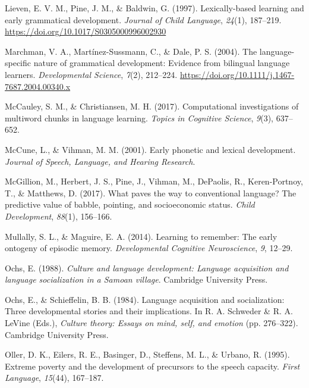 \documentclass[
  english,
  ,man,floatsintext]{apa6}
\begin{document}
\leavevmode\hypertarget{ref-lieven1997lexically}{}%
Lieven, E. V. M., Pine, J. M., \& Baldwin, G. (1997). Lexically-based learning and early grammatical development. \emph{Journal of Child Language}, \emph{24}(1), 187--219. \url{https://doi.org/10.1017/S0305000996002930}

\leavevmode\hypertarget{ref-marchman2004language}{}%
Marchman, V. A., Martínez-Sussmann, C., \& Dale, P. S. (2004). The language-specific nature of grammatical development: Evidence from bilingual language learners. \emph{Developmental Science}, \emph{7}(2), 212--224. \url{https://doi.org/10.1111/j.1467-7687.2004.00340.x}

\leavevmode\hypertarget{ref-mccauley2017computational}{}%
McCauley, S. M., \& Christiansen, M. H. (2017). Computational investigations of multiword chunks in language learning. \emph{Topics in Cognitive Science}, \emph{9}(3), 637--652.

\leavevmode\hypertarget{ref-mccune2001early}{}%
McCune, L., \& Vihman, M. M. (2001). Early phonetic and lexical development. \emph{Journal of Speech, Language, and Hearing Research}.

\leavevmode\hypertarget{ref-mcgillion2017paves}{}%
McGillion, M., Herbert, J. S., Pine, J., Vihman, M., DePaolis, R., Keren-Portnoy, T., \& Matthews, D. (2017). What paves the way to conventional language? The predictive value of babble, pointing, and socioeconomic status. \emph{Child Development}, \emph{88}(1), 156--166.

\leavevmode\hypertarget{ref-mullally2014learning}{}%
Mullally, S. L., \& Maguire, E. A. (2014). Learning to remember: The early ontogeny of episodic memory. \emph{Developmental Cognitive Neuroscience}, \emph{9}, 12--29.

\leavevmode\hypertarget{ref-ochs1988culture}{}%
Ochs, E. (1988). \emph{Culture and language development: Language acquisition and language socialization in a Samoan village}. Cambridge University Press.

\leavevmode\hypertarget{ref-ochs1984language}{}%
Ochs, E., \& Schieffelin, B. B. (1984). Language acquisition and socialization: Three developmental stories and their implications. In R. A. Schweder \& R. A. LeVine (Eds.), \emph{Culture theory: Essays on mind, self, and emotion} (pp. 276--322). Cambridge University Press.

\leavevmode\hypertarget{ref-oller1995extreme}{}%
Oller, D. K., Eilers, R. E., Basinger, D., Steffens, M. L., \& Urbano, R. (1995). Extreme poverty and the development of precursors to the speech capacity. \emph{First Language}, \emph{15}(44), 167--187.
\end{document}
